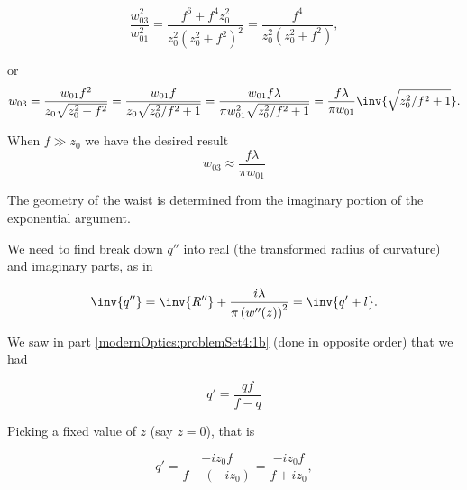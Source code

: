 {\begin{dmath}\label{eqn:problemSet4Problem1:260}
\frac{w_{03}^2}{w_{01}^2} 
= \frac{
f^6 + f^4 z_0^2
}{z_0^2 \left(z_0^2 + f^2\right)^2 }
= 
\frac{f^4}{z_0^2\left(z_0^2 + f^2\right) },
\end{dmath}

or
\begin{dmath}\label{eqn:problemSet4Problem1:280}
w_{03}
= 
\frac{w_{01} f^2}{z_0 \sqrt{z_0^2 + f^2} }
= 
\frac{w_{01} f}{z_0 \sqrt{z_0^2/f^2 + 1} }
=
\frac{w_{01} f \lambda}{\pi w_{01}^2 \sqrt{z_0^2/f^2 + 1} }
=
\frac{f \lambda}{\pi w_{01}} \inv{\sqrt{z_0^2/f^2 + 1} }.
\end{dmath}

When $f \gg z_0$ we have the desired result
\begin{dmath}\label{eqn:problemSet4Problem1:300}
\boxed{
w_{03}
\approx
\frac{f \lambda}{\pi w_{01}} 
}
\end{dmath}


The geometry of the waist is determined from the imaginary portion of the exponential argument.
%
%

We need to find break down $q''$ into real (the transformed radius of curvature) and imaginary parts, as in

\begin{equation}\label{eqn:problemSet4Problem1:340}
\inv{q''} = \inv{R''} + \frac{i \lambda}{\pi \left(w''(z) \right)^2 }
=
\inv{q' + l}.
\end{equation}

We saw in part \ref{modernOptics:problemSet4:1b} (done in opposite order) that we had

\begin{dmath}\label{eqn:problemSet4Problem1:360}
q' = \frac{q f}{f - q}
\end{dmath}

Picking a fixed value of $z$ (say $z = 0$), that is

\begin{dmath}\label{eqn:problemSet4Problem1:380}
q' = \frac{- i z_0 f}{ f - (-i z_0)} = \frac{-i z_0 f}{f + i z_0},
\end{dmath}

}
